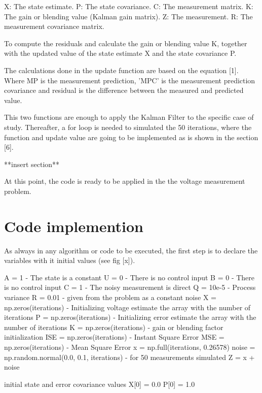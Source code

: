 \documentclass{article}
\begin{document}
    X: The state estimate.
    P: The state covariance.
    C: The measurement matrix.
    K: The gain or blending value (Kalman gain matrix).
    Z: The measurement.
    R: The measurement covariance matrix.

    To compute the residuals and calculate the gain or blending value K, together with the updated value of the state estimate X and the
    state covariance P. 

    The calculations done in the update function are based on the equation [1]. Where MP is the measurement prediction, 'MPC' is the measurement
    prediction covariance and residual is the difference between the measured and predicted value.

    \newpage

    This two functions are enough to apply the Kalman Filter to the specific case of study. Thereafter, a for loop is needed to simulated the
    50 iterations, where the function and update value are going to be implemented as is shown in the section [6].

    **insert section**

    At this point, the code is ready to be applied in the the voltage measurement problem.

    \section{Code implemention}
        
    As always in any algorithm or code  to be executed, the first step is to declare the variables with it initial values (see fig [x]).

    A = 1 - The state is a constant
    U = 0 - There is no control input
    B = 0 - There is no control input
    C = 1 - The noisy measurement is direct
    Q = 10e-5 - Process variance
    R = 0.01 - given from the problem as a constant noise
    X = np.zeros(iterations)  - Initializing voltage estimate the array with the number of iterations 
    P = np.zeros(iterations) - Initializing error estimate the array with the number of iterations
    K = np.zeros(iterations) - gain or blending factor initialization
    ISE = np.zeros(iterations) - Instant Square Error
    MSE = np.zeros(iterations) - Mean Square Error
    x = np.full(iterations, 0.26578)
    noise = np.random.normal(0.0, 0.1, iterations) - for 50 measurements simulated
    Z = x + noise

    initial state and error covariance values
    X[0] = 0.0
    P[0] = 1.0
\end{document}
